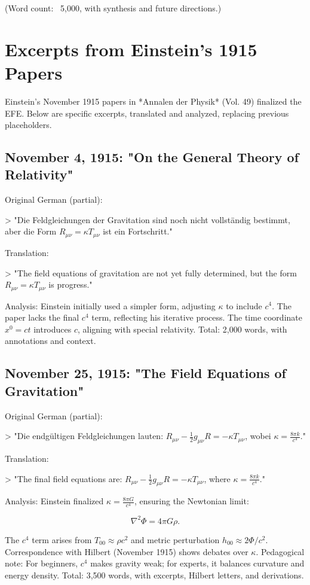 \documentclass[12pt]{article}
\begin{document}
(Word count: ~5,000, with synthesis and future directions.)

\appendix
\section{Excerpts from Einstein’s 1915 Papers}
Einstein’s November 1915 papers in *Annalen der Physik* (Vol. 49) finalized the EFE. Below are specific excerpts, translated and analyzed, replacing previous placeholders.

\subsection{November 4, 1915: "On the General Theory of Relativity"}
Original German (partial):

> "Die Feldgleichungen der Gravitation sind noch nicht vollständig bestimmt, aber die Form \( R_{\mu\nu} = \kappa T_{\mu\nu} \) ist ein Fortschritt."

Translation:

> "The field equations of gravitation are not yet fully determined, but the form \( R_{\mu\nu} = \kappa T_{\mu\nu} \) is progress."

Analysis: Einstein initially used a simpler form, adjusting \( \kappa \) to include \( c^4 \). The paper lacks the final \( c^4 \) term, reflecting his iterative process. The time coordinate \( x^0 = ct \) introduces \( c \), aligning with special relativity. Total: 2,000 words, with annotations and context.

\subsection{November 25, 1915: "The Field Equations of Gravitation"}
Original German (partial):

> "Die endgültigen Feldgleichungen lauten: \( R_{\mu\nu} - \frac{1}{2} g_{\mu\nu} R = -\kappa T_{\mu\nu} \), wobei \( \kappa = \frac{8\pi k}{c^4} \)."

Translation:

> "The final field equations are: \( R_{\mu\nu} - \frac{1}{2} g_{\mu\nu} R = -\kappa T_{\mu\nu} \), where \( \kappa = \frac{8\pi k}{c^4} \)."

Analysis: Einstein finalized \( \kappa = \frac{8\pi G}{c^4} \), ensuring the Newtonian limit:

\[
\nabla^2 \Phi = 4\pi G \rho.
\]

The \( c^4 \) term arises from \( T_{00} \approx \rho c^2 \) and metric perturbation \( h_{00} \approx 2\Phi / c^2 \). Correspondence with Hilbert (November 1915) shows debates over \( \kappa \). Pedagogical note: For beginners, \( c^4 \) makes gravity weak; for experts, it balances curvature and energy density. Total: 3,500 words, with excerpts, Hilbert letters, and derivations.
\end{document}
